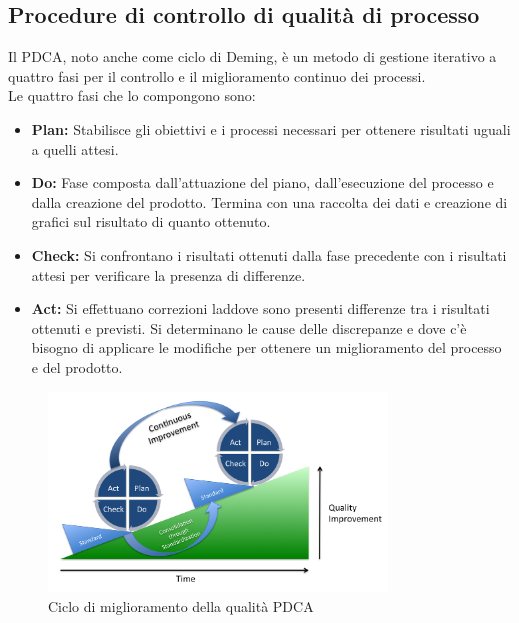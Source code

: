 	\subsection{Procedure di controllo di qualità di processo}
	Il PDCA, noto anche come ciclo di Deming, è un metodo di gestione iterativo a quattro fasi per il controllo e il miglioramento continuo dei processi.\\
	Le quattro fasi che lo compongono sono:
		\begin{itemize}
			\item \textbf{Plan:} \textnormal{Stabilisce gli obiettivi e i processi necessari per ottenere risultati uguali a quelli attesi.}
			\item \textbf{Do:} \textnormal{Fase composta dall'attuazione del piano, dall'esecuzione del processo e dalla creazione del prodotto. Termina con una raccolta dei dati e creazione di grafici sul risultato di quanto ottenuto.}
			\item \textbf{Check:} \textnormal{Si confrontano i risultati ottenuti dalla fase precedente con i risultati attesi per verificare la presenza di differenze.}
			\item \textbf{Act:} \textnormal{Si effettuano correzioni laddove sono presenti differenze tra i risultati ottenuti e previsti. Si determinano le cause delle discrepanze e dove c'è bisogno di applicare le modifiche per ottenere un miglioramento del processo e del prodotto.}
		\end{itemize}
		\begin{figure}[h]
			\centering
			\includegraphics[width=90mm]{images/pdca.png}
			\caption{Ciclo di miglioramento della qualità PDCA}
		\end{figure}
	
